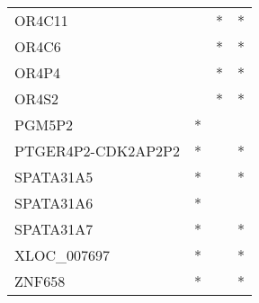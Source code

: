 \begin{tabular}{lccc}
OR4C11             &     &   * &       * \\
OR4C6              &     &   * &       * \\
OR4P4              &     &   * &       * \\
OR4S2              &     &   * &       * \\
PGM5P2             &   * &     &         \\
PTGER4P2-CDK2AP2P2 &   * &     &       * \\
SPATA31A5          &   * &     &       * \\
SPATA31A6          &   * &     &         \\
SPATA31A7          &   * &     &       * \\
XLOC\_007697        &   * &     &       * \\
ZNF658             &   * &     &       * \\
\bottomrule
\end{tabular}
